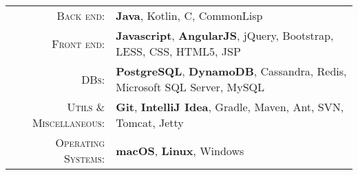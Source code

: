 %
%
%

\renewcommand{\arraystretch}{1.1}

	\begin{tabular}{>{}r>{}p{13cm}} 
		\textsc{Back end:} &
			\textbf{Java}, Kotlin, C, CommonLisp \\
		\textsc{Front end:} &
			\textbf{Javascript}, \textbf{AngularJS}, jQuery, Bootstrap, LESS, CSS, HTML5, JSP \\ 
		\textsc{DBs:} & 
			\textbf{PostgreSQL}, \textbf{DynamoDB}, Cassandra, Redis, Microsoft SQL Server, MySQL \\ 
		\textsc{Utils \& Miscellaneous:} &
			\textbf{Git}, \textbf{IntelliJ Idea}, Gradle, Maven, Ant, SVN, Tomcat, Jetty \\
		\textsc{Operating Systems:} &
			\textbf{macOS}, \textbf{Linux}, Windows \\ 
	\end{tabular}